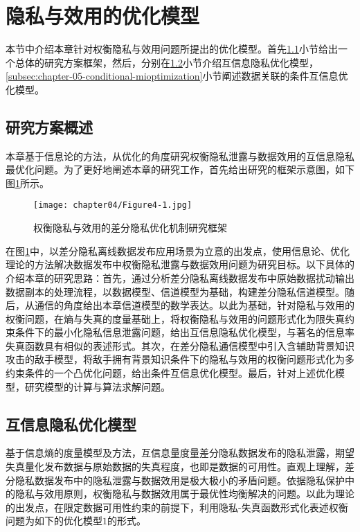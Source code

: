 \section{隐私与效用的优化模型}\label{chapter05-optimal-model}
本节中介绍本章针对权衡隐私与效用问题所提出的优化模型。首先\ref{subsec:chapter05-yjsl}小节给出一个总体的研究方案框架，然后，分别在\ref{subsec:chapter05-mi-optimazation}小节介绍互信息隐私优化模型，\ref{subsec:chapter-05-conditional-mioptimization}小节阐述数据关联的条件互信息优化模型。

\subsection{研究方案概述}\label{subsec:chapter05-yjsl}
本章基于信息论的方法，从优化的角度研究权衡隐私泄露与数据效用的互信息隐私最优化问题。为了更好地阐述本章的研究工作，首先给出研究的框架示意图，如下图\ref{Fig:chapter05-1}所示。
\begin{figure}[htbp]
	\centering
	\texttt{[image: chapter04/Figure4-1.jpg]}
	\caption{权衡隐私与效用的差分隐私优化机制研究框架}
	\label{Fig:chapter05-1}
\end{figure}

在图\ref{Fig:chapter05-1}中，以差分隐私离线数据发布应用场景为立意的出发点，使用信息论、优化理论的方法解决数据发布中权衡隐私泄露与数据效用问题为研究目标。以下具体的介绍本章的研究思路：首先，通过分析差分隐私离线数据发布中原始数据扰动输出数据副本的处理流程，以数据模型、信道模型为基础，构建差分隐私信道模型。随后，从通信的角度给出本章信道模型的数学表达。以此为基础，针对隐私与效用的权衡问题，在熵与失真的度量基础上，将权衡隐私与效用的问题形式化为限失真约束条件下的最小化隐私信息泄露问题，给出互信息隐私优化模型，与著名的信息率失真函数具有相似的表述形式。其次，在差分隐私通信模型中引入含辅助背景知识攻击的敌手模型，将敌手拥有背景知识条件下的隐私与效用的权衡问题形式化为多约束条件的一个凸优化问题，给出条件互信息优化模型。最后，针对上述优化模型，研究模型的计算与算法求解问题。

\subsection{互信息隐私优化模型}\label{subsec:chapter05-mi-optimazation}
基于信息熵的度量模型及方法，互信息量度量差分隐私数据发布的隐私泄露，期望失真量化发布数据与原始数据的失真程度，也即是数据的可用性。直观上理解，差分隐私数据发布中的隐私泄露与数据效用是极大极小的矛盾问题。依据隐私保护中的隐私与效用原则\cite{sankar2013utility}，权衡隐私与数据效用属于最优性均衡解决的问题。以此为理论的出发点，在限定数据可用性约束的前提下，利用隐私-失真函数形式化表述权衡问题为如下的优化模型$1$的形式。

